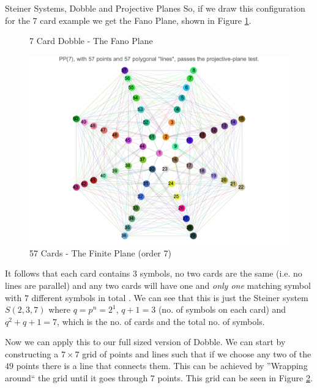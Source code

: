 \documentclass[final]{beamer}
\newlength{\colwidth}
\begin{document}
\begin{frame}[t]
\begin{columns}[t]
\begin{column}{\colwidth}
\begin{block}{Steiner Systems, Dobble and Projective Planes}
     So, if we draw this configuration for the $7$ card example we get the Fano Plane, shown in Figure \ref{fig:fano}.
    \begin{multicols}{2}
\begin{figure}
      \centering
      \caption{7 Card Dobble - The Fano Plane}
      \label{fig:fano}
\end{figure}

\begin{figure}
    \includegraphics[width=14cm,trim={0 0.5cm 0 2cm},clip]{image1}
    \caption{57 Cards - The Finite Plane (order 7) \cite{beresford2011}}
    \label{fig:pporder7}
\end{figure}
    \end{multicols}
  
    It follows that each card contains $3$ symbols, no two cards are the same (i.e. no lines are parallel) and any two cards will have one and \emph{only one} matching symbol with $7$ different symbols in total \cite{westenbrink2022}.
    We can see that this is just the Steiner system $S(2,3,7)$ where $q = p^n = 2^1$, $q + 1 = 3$ (no. of symbols on each card) and $q^2 + q + 1 = 7$, which is the no. of cards and the total no. of symbols.
    
    Now we can apply this to our full sized version of Dobble. We can start by constructing a $7\times7$ grid of points and lines such that if we choose any two of the $49$ points there is a line that connects them. This can be achieved by ''Wrapping around`` the grid until it goes through $7$ points. This grid can be seen in Figure \ref{fig:pporder7}.


\end{block}
\end{column}
\end{columns}
\end{frame}
\end{document}
